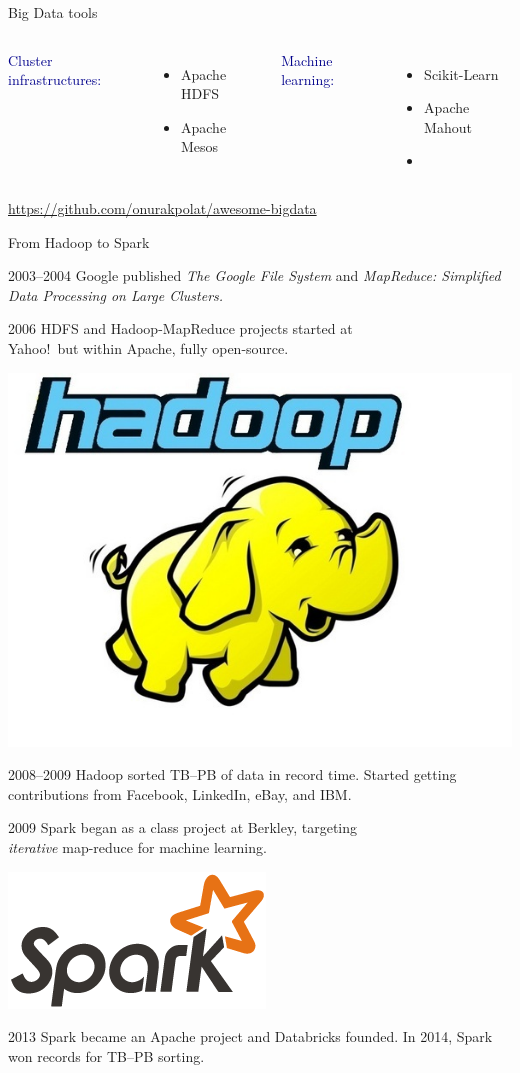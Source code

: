 \documentclass{beamer}
\begin{document}
{\begin{frame}{Big Data tools}
\begin{columns}
\textcolor{darkblue}{Cluster infrastructures:}

\begin{itemize}
\item Apache HDFS
\item Apache Mesos
\end{itemize}

\textcolor{darkblue}{Machine learning:}

\begin{itemize}
\item Scikit-Learn
\item Apache Mahout
\item {}
\end{itemize}
\end{columns}

\hfill \textcolor{blue}{\scriptsize \url{https://github.com/onurakpolat/awesome-bigdata}}
\end{frame}}

\begin{frame}{From Hadoop to Spark}
\vspace{-0.1 cm}
\begin{block}{2003--2004}
Google published {\it The Google File System} and {\it MapReduce: Simplified Data Processing on Large Clusters.}
\end{block}

\begin{block}{2006}
HDFS and Hadoop-MapReduce projects started at \\ Yahoo!\ but within Apache, fully open-source.

\vspace{-1.4 cm} \hfill \includegraphics[width=2 cm]{01_Hadoop_full.jpg}
\end{block}

\begin{block}{2008--2009}
Hadoop sorted TB--PB of data in record time. Started getting contributions from Facebook, LinkedIn, eBay, and IBM.
\end{block}

\begin{block}{2009}
Spark began as a class project at Berkley, targeting \\ {\it iterative} map-reduce for machine learning.

\vspace{-1.1 cm} \hfill \includegraphics[width=2 cm]{spark-logo.png}
\end{block}

\begin{block}{2013}
Spark became an Apache project and Databricks founded. In 2014, Spark won records for TB--PB sorting.
\end{block}
\end{frame}
\end{document}

